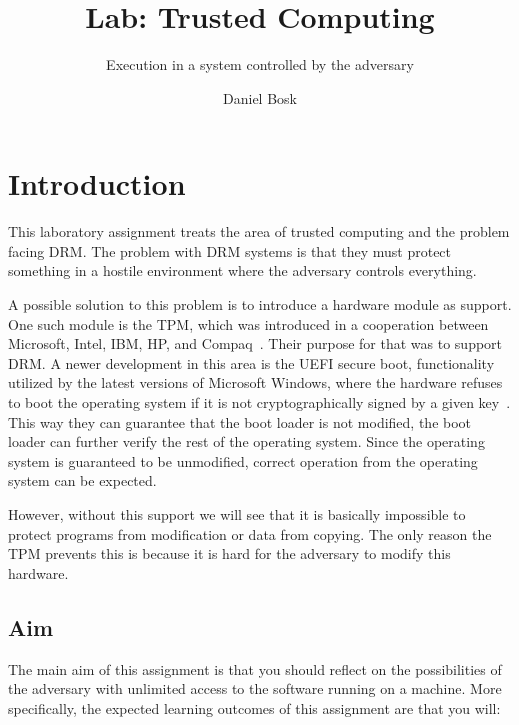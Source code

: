 \title{Lab: Trusted Computing}
\subtitle{Execution in a system controlled by the adversary}
\author{%
  Daniel Bosk
}
\maketitle

\section{Introduction}
\label{sec:intro}
This laboratory assignment treats the area of trusted computing and the problem 
facing \ac{DRM}.
The problem with \ac{DRM} systems is that they must protect something in 
a hostile environment where the adversary controls everything.

A possible solution to this problem is to introduce a hardware module as 
support.
One such module is the \ac{TPM}, which was introduced in a cooperation between 
Microsoft, Intel, IBM, HP, and Compaq~\cite{Anderson2008sea}.
Their purpose for that was to support \ac{DRM}.
A newer development in this area is the UEFI secure boot, functionality 
utilized by the latest versions of Microsoft Windows, where the hardware 
refuses to boot the operating system if it is not cryptographically signed by 
a given key~\cite{WinUEFIboot}.
This way they can guarantee that the boot loader is not modified, the boot 
loader can further verify the rest of the operating system.
Since the operating system is guaranteed to be unmodified, correct operation 
from the operating system can be expected.

However, without this support we will see that it is basically impossible to 
protect programs from modification or data from copying.
The only reason the \ac{TPM} prevents this is because it is hard for the 
adversary to modify this hardware.

\subsection{Aim}
\label{sec:aim}
The main aim of this assignment is that you should reflect on the possibilities 
of the adversary with unlimited access to the software running on a machine.
More specifically, the expected learning outcomes of this assignment are that 
you will:
\begin{itemize}
    
\end{itemize}

